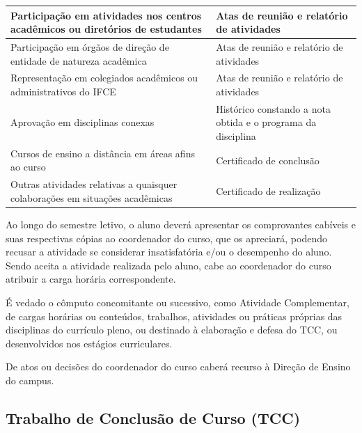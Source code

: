 \documentclass{paper}
\begin{document}
\begin{longtable}{|p{8.5cm}|p{5.5cm}|}
 Participação em atividades nos centros acadêmicos ou diretórios de estudantes & Atas de reunião e relatório de atividades \\
 
 \hline
 
 Participação em órgãos de direção de entidade de natureza acadêmica & Atas de reunião e relatório de atividades \\
 
 \hline
 
 Representação em colegiados acadêmicos ou administrativos do IFCE & Atas de reunião e relatório de atividades \\
 
 \hline
 
 Aprovação em disciplinas conexas & Histórico constando a nota obtida e o programa da disciplina\\
 
 \hline
 
 Cursos de ensino a distância em áreas afins ao curso & Certificado de conclusão\\
 
 \hline
 
 Outras atividades relativas a quaisquer colaborações em situações acadêmicas & Certificado de realização\\

 \hline
 
 \end{longtable} 

Ao longo do semestre letivo, o aluno deverá apresentar os comprovantes cabíveis e suas respectivas cópias ao coordenador do curso, que os apreciará, podendo recusar a atividade se considerar insatisfatória e/ou o desempenho do aluno. Sendo aceita a atividade realizada pelo aluno, cabe ao coordenador do curso atribuir a carga horária correspondente.


É vedado o cômputo concomitante ou sucessivo, como Atividade Complementar, de cargas horárias ou conteúdos, trabalhos, atividades ou práticas próprias das disciplinas do currículo pleno, ou destinado à elaboração e defesa do TCC, ou desenvolvidos nos estágios curriculares.

De atos ou decisões do coordenador do curso caberá recurso à Direção de Ensino do campus.

\subsection{Trabalho de Conclusão de Curso (TCC)}
\end{document}
